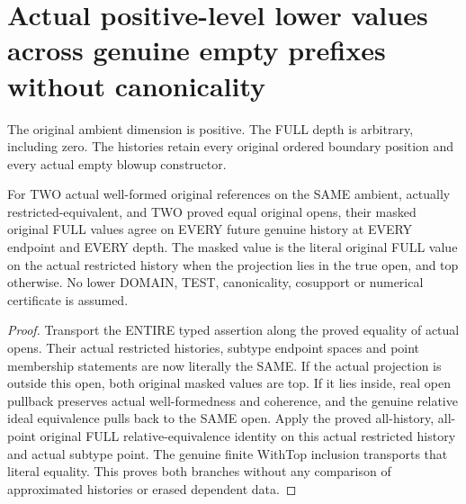 \section{Actual positive-level lower values across genuine empty prefixes without canonicality}

The original ambient dimension is positive. The FULL depth is arbitrary,
including zero. The histories retain every original ordered boundary
position and every actual empty blowup constructor.

\begin{lemma}
\label{hir:original-equal-open-relative-equivalence-masked-full-value}
\leanok
For TWO actual well-formed original references on the SAME ambient,
actually restricted-equivalent, and TWO proved equal original opens,
their masked original FULL values agree on EVERY future genuine history
at EVERY endpoint and EVERY depth. The masked value is the literal
original FULL value on the actual restricted history when the projection
lies in the true open, and top otherwise. No lower DOMAIN, TEST,
canonicality, cosupport or numerical certificate is assumed.
\end{lemma}
\begin{proof}
Transport the ENTIRE typed assertion along the proved equality of actual
opens. Their actual restricted histories, subtype endpoint spaces and
point membership statements are now literally the SAME. If the actual
projection is outside this open, both original masked values are top.
If it lies inside, real open pullback preserves actual well-formedness
and coherence, and the genuine relative ideal equivalence pulls back to
the SAME open. Apply the proved all-history, all-point original FULL
relative-equivalence identity on this actual restricted history and
actual subtype point. The genuine finite WithTop inclusion transports
that literal equality. This proves both branches without any comparison
of approximated histories or erased dependent data.
\end{proof}

